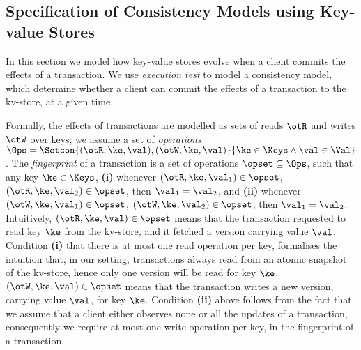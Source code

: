 \subsection{Specification of Consistency Models using Key-value Stores}
\label{sec:execution.tests}

In this section we model how key-value stores evolve when a client commits 
the effects of a transaction.
We use \emph{execution test} to model a consistency model, which determine whether 
a client can commit the effects of a transaction to the kv-store, at a given time.

Formally, the effects of transactions are modelled as sets of reads \( \otR \) and writes \( \otW \)
over keys; we assume a set of \emph{operations} $\Ops = \Setcon{(\otR, \ke, \val), (\otW, \ke, \val) }{ \ke \in \Keys \wedge 
\val \in \Val }$. The \emph{fingerprint} of a transaction is a 
set of operations $\opset \subseteq \Ops$, such that any key $\ke \in \Keys$,
\textbf{(i)} whenever $(\otR, \ke, \val_1) \in \opset$, $(\otR, \ke, \val_2) \in \opset$, then $\val_1 = \val_2$, 
and \textbf{(ii)} whenever $(\otW, \ke, \val_1) \in \opset$, $(\otW, \ke, \val_2) \in \opset$, then $\val_1 = \val_2$. 
Intuitively, $(\otR, \ke, \val) \in \opset$ means that the transaction requested to read key $\ke$ from the kv-store, 
and it fetched a version carrying value $\val$. Condition \textbf{(i)} that there is at most one read operation per key, 
formalises the intuition that, in our setting, 
transactions always read from an atomic snapshot of the kv-store, hence only one version will be read for key $\ke$. 
$(\otW, \ke, \val) \in \opset$ means that the transaction writes a new version, carrying value $\val$, for key $\ke$. 
Condition \textbf{(ii)} above follows from the fact that we assume that a client either observes none or all the updates 
of a transaction, consequently we require at most one write operation per key, in the fingerprint of a transaction. 



